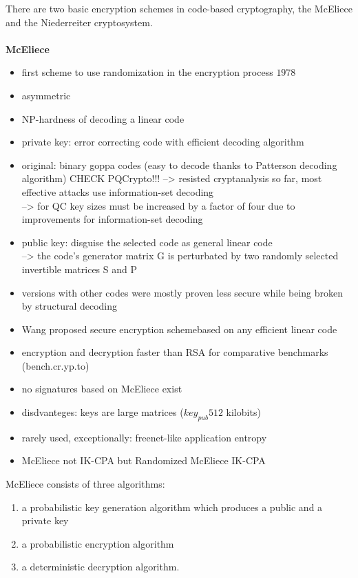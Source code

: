 \documentclass[a4paper,11pt]{article}
\begin{document}
\begin{multicols}{2}
There are two basic encryption schemes in code-based cryptography, the McEliece and the Niederreiter cryptosystem. \\ \\
\textbf{McEliece}
\begin{itemize} 
\item first scheme to use randomization in the encryption process $1978$
\item asymmetric
\item NP-hardness of decoding a linear code 
\item private key: error correcting code with efficient decoding algorithm 
\item original: binary goppa codes (easy to decode thanks to Patterson decoding algorithm) CHECK PQCrypto!!! 
--> resisted cryptanalysis so far, most effective attacks use information-set decoding \\
--> for QC key sizes must be increased by a factor of four due to improvements for information-set decoding
\item public key: disguise the selected code as general linear code \\
--> the code's generator matrix G is perturbated by two randomly selected invertible matrices S and P 
\item versions with other codes were mostly proven less secure while being broken by structural decoding 
\item Wang proposed secure encryption schemebased on any efficient linear code 
\item encryption and decryption faster than RSA for comparative benchmarks (bench.cr.yp.to) 
\item no signatures based on McEliece exist
\item disdvanteges: keys are large matrices ($key_{pub} 512$ kilobits)
\item rarely used, exceptionally: freenet-like application entropy 
\item McEliece not IK-CPA but Randomized McEliece IK-CPA
\end{itemize} 

McEliece consists of three algorithms: 

\begin{enumerate} 
\item[1)]a probabilistic key generation algorithm which produces a public and a private key
\item[2)] a probabilistic encryption algorithm
\item[3)] a deterministic decryption algorithm.
\end{enumerate} 


\end{multicols}
\end{document}
